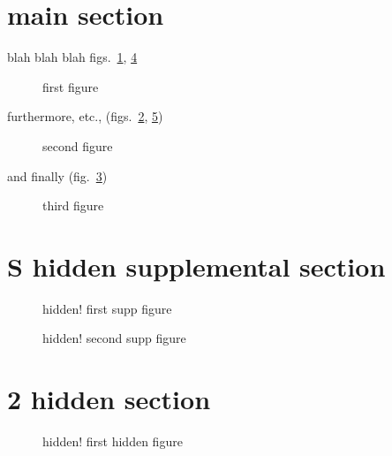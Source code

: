 \section*{main section}\label{main-section}

blah blah blah figs.~\ref{fig:fig1}, \ref{fig:fig_s1}

\begin{figure}
\centering
{}
\caption{first figure}\label{fig:fig1}
\end{figure}

furthermore, etc., (figs.~\ref{fig:fig2}, \ref{fig:fig_s2})

\begin{figure}
\centering
{}
\caption{second figure}\label{fig:fig2}
\end{figure}

and finally (fig.~\ref{fig:fig3})

\begin{figure}
\centering
{}
\caption{third figure}\label{fig:fig3}
\end{figure}

\section{S hidden supplemental
section}\label{hidden-supplemental-section}

\begin{figure}
\centering
{}
\caption[]{hidden! first supp figure}\label{fig:fig_s1}
\end{figure}

\begin{figure}
\centering
{}
\caption[]{hidden! second supp figure}\label{fig:fig_s2}
\end{figure}

\section{2 hidden section}\label{hidden-section}

\begin{figure}
\centering
{}
\caption[]{hidden! first hidden figure}\label{fig:fig_h1}
\end{figure}

